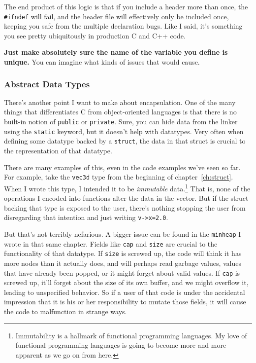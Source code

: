 \documentclass[ebook,11pt,oneside,openany]{memoir}
\newcommand{\cf}[1]{\texttt{#1}}
\begin{document}
The end product of this logic is that if you include a header more than once, the \cf{\#ifndef} will fail, and the header file will effectively only be included once, keeping you safe from the multiple declaration bugs. Like I said, it's something you see pretty ubiquitously in production C and C++ code.

\textbf{Just make absolutely sure the name of the variable you define is unique.} You can imagine what kinds of issues that would cause.

\subsubsection{Abstract Data Types}

There's another point I want to make about encapsulation. One of the many things that differentiates C from object-oriented languages is that there is no built-in notion of \cf{public} or \cf{private}. Sure, you can hide data from the linker using the \cf{static} keyword, but it doesn't help with datatypes. Very often when defining some datatype backed by a \cf{struct}, the data in that struct is crucial to the representation of that datatype.

There are many examples of this, even in the code examples we've seen so far. For example, take the \cf{vec3d} type from the beginning of chapter~\ref{ch:struct}. When I wrote this type, I intended it to be \textit{immutable} data.\footnote{Immutability is a hallmark of functional programming languages. My love of functional programming languages is going to become more and more apparent as we go on from here. } That is, none of the operations I encoded into functions alter the data in the vector. But if the struct backing that type is exposed to the user, there's nothing stopping the user from disregarding that intention and just writing \cf{v->x=2.0}.

But that's not terribly nefarious. A bigger issue can be found in the \cf{minheap} I wrote in that same chapter. Fields like \cf{cap} and \cf{size} are crucial to the functionality of that datatype. If \cf{size} is screwed up, the code will think it has more nodes than it actually does, and will perhaps read garbage values, values that have already been popped, or it might forget about valid values. If \cf{cap} is screwed up, it'll forget about the size of its own buffer, and we might overflow it, leading to unspecified behavior. So if a user of that code is under the accidental impression that it is his or her responsibility to mutate those fields, it will cause the code to malfunction in strange ways.
\end{document}
